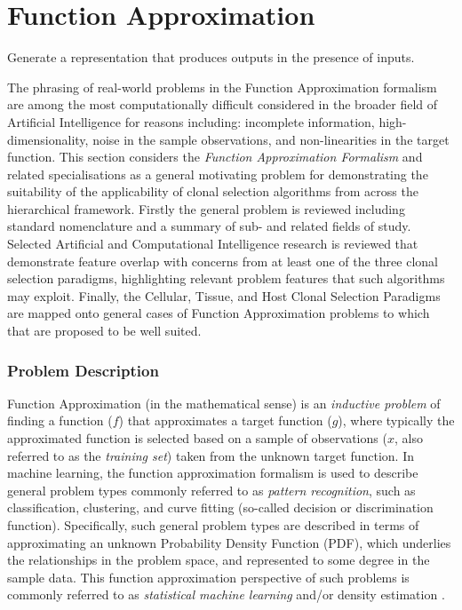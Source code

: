 \documentclass[a4paper, 11pt]{article}
\begin{document}
% 
%
\section{Function Approximation}
Generate a representation that produces outputs in the presence of inputs.


The phrasing of real-world problems in the Function Approximation formalism are among the most computationally difficult considered in the broader field of Artificial Intelligence for reasons including: incomplete information, high-dimensionality, noise in the sample observations, and non-linearities in the target function.
This section considers the \emph{Function Approximation Formalism} and related specialisations as a general motivating problem for demonstrating the suitability of the applicability of clonal selection algorithms from across the hierarchical framework.
Firstly the general problem is reviewed including standard nomenclature and a summary of sub- and related fields of study. Selected Artificial and Computational Intelligence research is reviewed that demonstrate feature overlap with concerns from at least one of the three clonal selection paradigms, highlighting relevant problem features that such algorithms may exploit. Finally, the Cellular, Tissue, and Host Clonal Selection Paradigms are mapped onto general cases of Function Approximation problems to which that are proposed to be well suited.

%
%
\subsubsection{Problem Description}
Function Approximation (in the mathematical sense) is an \emph{inductive problem} of finding a function ($f$) that approximates a target function ($g$), where typically the approximated function is selected based on a sample of observations ($x$, also referred to as the \emph{training set}) taken from the unknown target function.
In machine learning, the function approximation formalism is used to describe general problem types commonly referred to as \emph{pattern recognition}, such as classification, clustering, and curve fitting (so-called decision or discrimination function). Specifically, such general problem types are described in terms of approximating an unknown Probability Density Function (PDF), which underlies the relationships in the problem space, and represented to some degree in the sample data. This function approximation perspective of such problems is commonly referred to as \emph{statistical machine learning} and/or density estimation \cite{Fukunaga1990, Bishop1995}.
\end{document}

